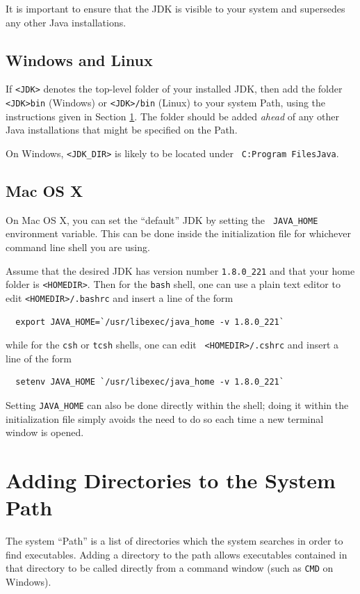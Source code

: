 \documentclass{article}
\begin{document}
It is important to ensure that the JDK is visible to your system and
supersedes any other Java installations.

\subsection*{Windows and Linux}

If {\tt <JDK>} denotes the top-level folder of your installed JDK,
then add the folder {\tt <JDK>\BKS bin} (Windows) or {\tt <JDK>/bin}
(Linux) to your system Path, using the instructions given in Section
\ref{SettingPath}. The folder should be added {\it ahead} of any other
Java installations that might be specified on the Path.

On Windows, {\tt <JDK\_DIR>} is likely to be located under {\tt
C:\BKS Program Files\BKS Java}.

\subsection*{Mac OS X}

On Mac OS X, you can set the ``default'' JDK by setting the {\tt
JAVA\_HOME} environment variable.  This can be done inside the
initialization file for whichever command line shell you are using.

Assume that the desired JDK has version number {\tt 1.8.0\_221} and
that your home folder is {\tt <HOMEDIR>}.  Then for the {\tt bash}
shell, one can use a plain text editor to edit {\tt <HOMEDIR>/.bashrc}
and insert a line of the form
\begin{verbatim}
  export JAVA_HOME=`/usr/libexec/java_home -v 1.8.0_221`
\end{verbatim}
while for the {\tt csh} or {\tt tcsh} shells, one can edit {\tt
<HOMEDIR>/.cshrc} and insert a line of the form
\begin{verbatim}
  setenv JAVA_HOME `/usr/libexec/java_home -v 1.8.0_221`
\end{verbatim}

Setting {\tt JAVA\_HOME} can also be done directly within the shell;
doing it within the initialization file simply avoids the need to do
so each time a new terminal window is opened.

\section{Adding Directories to the System Path}
\label{SettingPath}

The system ``Path'' is a list of directories which the system searches
in order to find executables. Adding a directory to the path allows
executables contained in that directory to be called directly from a
command window (such as {\tt CMD} on Windows).
\end{document}
